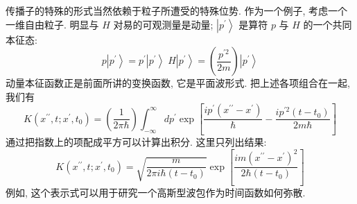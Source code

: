 传播子的特殊的形式当然依赖于粒子所遭受的特殊位势. 作为一个例子, 考虑一个一维自由粒子. 明显与 $H$ 对易的可观测量是动量; $\left| {p}^{\prime }\right\rangle$ 是算符 $p$ 与 $H$ 的一个共同本征态:
\begin{equation}
p\left| {p}^{\prime }\right\rangle = {p}^{\prime }\left| {p}^{\prime }\right\rangle \;H\left| {p}^{\prime }\right\rangle = \left( \frac{{p}^{\prime 2}}{2m}\right) \left| {p}^{\prime }\right\rangle
\end{equation}
动量本征函数正是前面所讲的变换函数, 它是平面波形式. 把上述各项组合在一起, 我们有
\begin{equation}
K\left( {{x}^{\prime \prime }, t;{x}^{\prime },{t}_{0}}\right) = \left( \frac{1}{{2\pi }\hbar }\right) \int_{-\infty }^{\infty }d{p}^{\prime }\exp \left\lbrack {\frac{i{p}^{\prime }\left( {{x}^{\prime \prime } - {x}^{\prime }}\right) }{\hbar } - \frac{i{p}^{\prime 2}\left( {t - {t}_{0}}\right) }{{2m}\hbar }}\right\rbrack
\end{equation}
通过把指数上的项配成平方可以计算出积分. 这里只列出结果:
\begin{equation}
K\left( {{x}^{\prime \prime }, t;{x}^{\prime },{t}_{0}}\right) = \sqrt{\frac{m}{{2\pi i}\hbar \left( {t - {t}_{0}}\right) }}\exp \left\lbrack \frac{{im}{\left( {x}^{\prime \prime } - {x}^{\prime }\right) }^{2}}{2\hbar \left( {t - {t}_{0}}\right) }\right\rbrack
\end{equation}
例如, 这个表示式可以用于研究一个高斯型波包作为时间函数如何弥散.

